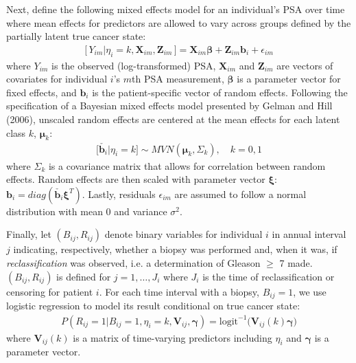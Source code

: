 \documentclass[letterpaper]{article}
\newcommand{\bmbeta}{\boldsymbol{\beta}}
\newcommand{\bmxi}{\boldsymbol{\xi}}
\newcommand{\bmmu}{\boldsymbol{\mu}}
\newcommand{\bmgamma}{\boldsymbol{\gamma}}
\newcommand{\bmZ}{\mathbf{Z}}
\newcommand{\bmX}{\mathbf{X}}
\newcommand{\bmV}{\mathbf{V}}
\newcommand{\bmb}{\mathbf{b}}
\begin{document}
Next, define the following mixed effects model \cite{Laird1982} for an individual's PSA over time where mean effects for predictors are allowed to vary across groups defined by the partially latent true cancer state:
\begin{eqnarray*}
\big[\, Y_{im} | \eta_i=k, \bmX_{im}, \bmZ_{im}\,\big] = \bmX_{im}\bmbeta + \bmZ_{im}\bmb_i + \epsilon_{im}
\end{eqnarray*}
where $Y_{im}$ is the observed (log-transformed) PSA, $\bmX_{im}$ and $\bmZ_{im}$ are vectors of covariates for individual $i$'s $m$th PSA measurement, $\bmbeta$ is a parameter vector for fixed effects, and $\bmb_i$ is the patient-specific vector of random effects. Following the specification of a Bayesian mixed effects model presented by Gelman and Hill (2006)\nocite{Gelman2006}, unscaled random effects are centered at the mean effects for each latent class $k$, $\bmmu_k$:
\begin{eqnarray*}
\big[\check{\bmb_i} | \eta_i=k\big] \sim MVN ( \bmmu_k, \Sigma_k), \quad k=0,1 
\end{eqnarray*}
where $\Sigma_k$ is a covariance matrix that allows for correlation between random effects. Random effects are then scaled with parameter vector $\bmxi$: $\bmb_i = diag(\check{\bmb_i}\bmxi^T)$. Lastly, residuals $\epsilon_{im}$ are assumed to follow a normal distribution with mean 0 and variance $\sigma^2$.

Finally, let $(B_{ij}, R_{ij})$ denote binary variables for individual $i$ in annual interval $j$ indicating, respectively, whether a biopsy was performed and, when it was, if \textit{reclassification} was observed, i.e. a determination of Gleason $\geq$ 7 made. $(B_{ij}, R_{ij})$ is defined for $j=1,\dots, J_i$ where $J_i$ is the time of reclassification or censoring for patient $i$. For each time interval with a biopsy, $B_{ij}=1$, we use logistic regression to model its result conditional on true cancer state:
\begin{eqnarray}
\label{eq:p_rc}
P(R_{ij}=1 | B_{ij}=1, \eta_i=k, \bmV_{ij}, \bmgamma) = \text{logit}^{-1}\big( \bmV_{ij}(k)\bmgamma \big)
\end{eqnarray}
where $\bmV_{ij}(k)$ is a matrix of time-varying predictors including $\eta_i$ and $\bmgamma$ is a parameter vector. 
\end{document}
